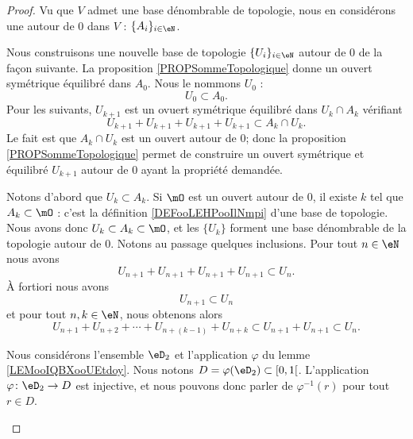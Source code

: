 \begin{proof}
	Vu que \( V\) admet une base dénombrable de topologie, nous en considérons une autour de \( 0\) dans \( V\) : \( \{ A_i \}_{i\in \eN}\).

	\begin{subproof}
		Nous construisons une nouvelle base de topologie \( \{ U_i \}_{i\in \eN}\) autour de \( 0\) de la façon suivante. La proposition \ref{PROPSommeTopologique} donne un ouvert symétrique équilibré dans \( A_0\). Nous le nommons \( U_0\) :
		\begin{equation}
			U_0\subset A_0.
		\end{equation}
		Pour les suivants, \( U_{k+1}\) est un ovuert symétrique équilibré dans \( U_{k}\cap A_k\) vérifiant
		\begin{equation}
			U_{k+1}+U_{k+1}+U_{k+1}+U_{k+1}\subset A_k\cap U_{k}.       \label{EQooECMVooLllLhu}
		\end{equation}
		Le fait est que \( A_k\cap U_k\) est un ouvert autour de \( 0\); donc la proposition \ref{PROPSommeTopologique} permet de construire un ouvert symétrique et équilibré \( U_{k+1}\) autour de \( 0\) ayant la propriété demandée.

		Notons d'abord que \( U_k\subset A_k\). Si \( \mO\) est un ouvert autour de \( 0\), il existe \( k\) tel que \( A_k\subset \mO\) : c'est la définition \ref{DEFooLEHPooIlNmpi} d'une base de topologie. Nous avons donc \( U_k\subset A_k\subset \mO\), et les \( \{ U_k \}\) forment une base dénombrable de la topologie autour de \( 0\).
		Notons au passage quelques inclusions. Pour tout \( n\in \eN\) nous avons
		\begin{equation}    \label{EqBaseTopoMetriquePf1}
			U_{n+1} + U_{n+1} + U_{n+1} + U_{n+1} \subset U_n.
		\end{equation}
		À fortiori nous avons
		\begin{equation}        \label{EQooARBRooOiAVhH}
			U_{n+1}\subset U_n
		\end{equation}
		et pour tout \( n,k\in \eN\), nous obtenons alors
		\begin{equation}\label{EqBaseTopoMetriquePf2}
			U_{n+1} + U_{n+2} + \cdots  + U_{n+(k-1)} + U_{n+k} \subset  U_{n+1} + U_{n+1} \subset U_n.
		\end{equation}

		\spitem[L'ensemble \( D\)]
		Nous considérons l'ensemble \( \eD_2\) et l'application \( \varphi\) du lemme \ref{LEMooIQBXooUEtdoy}. Nous notons \( D=\varphi(\eD_2)\subset\mathopen[ 0 , 1 \mathclose[\). L'application \( \varphi\colon \eD_2\to D\) est injective, et nous pouvons donc parler de \( \varphi^{-1}(r)\) pour tout \( r\in D\).


\end{subproof}
\end{proof}

